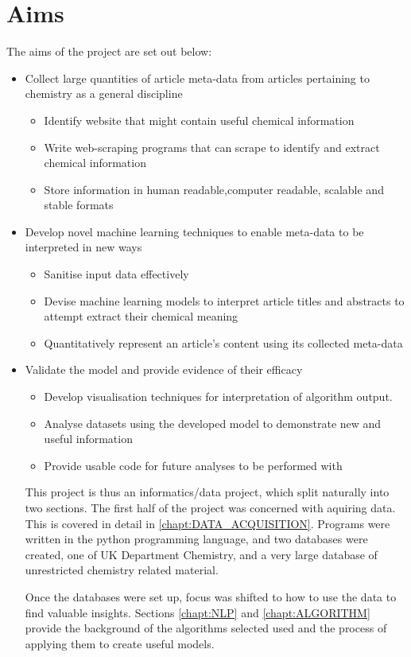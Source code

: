 \section{Aims}
The aims of the project are set out below:
\begin{itemize}
\item Collect large quantities of article meta-data from articles pertaining to chemistry as a general discipline
\begin{itemize}
\item Identify website that might contain useful chemical information
\item Write web-scraping programs that can scrape to identify and extract chemical information
\item Store information in human readable,computer readable, scalable and stable formats
\end{itemize}
\item Develop novel machine learning techniques to enable meta-data to be interpreted in new ways
\begin{itemize}
\itemsep0em 
\item Sanitise input data effectively
\item Devise  machine learning models to interpret article titles and abstracts to attempt extract their chemical meaning
\item Quantitatively represent an article's content using its collected meta-data
\end{itemize}
\item Validate the model and provide evidence of their efficacy
\begin{itemize}
\item Develop visualisation techniques for interpretation of algorithm output.
\item Analyse datasets using the developed model to demonstrate new and useful information
\item Provide usable code for future analyses to be performed with
\end{itemize}

This project is thus an informatics/data project, which split naturally into two sections. The first half of the project was concerned with aquiring data. This is covered in detail in \ref{chapt:DATA_ACQUISITION}.
Programs were written in the python programming language, and two databases were created, one of UK Department Chemistry, and a very large database of unrestricted chemistry related material.

Once the databases were set up, focus was shifted to how to use the data to find valuable insights. Sections \ref{chapt:NLP} and \ref{chapt:ALGORITHM} provide the background of the algorithms selected used and the process of applying them to create useful models. 


\end{itemize}
